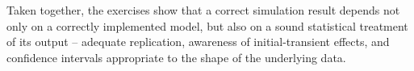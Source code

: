 \documentclass[12pt]{article}
\begin{document}
Taken together, the exercises show that a correct simulation result depends not only on a correctly implemented model, but also on a sound statistical treatment of its output -- adequate replication, awareness of initial-transient effects, and confidence intervals appropriate to the shape of the underlying data.
\end{document}
